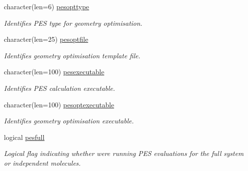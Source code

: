 \begin{DoxyCompactItemize}
character(len=6) \mbox{\hyperlink{namespaceglobaldata_a4c196084db36cecdbc9b6a6508a34aeb}{pesopttype}}
\begin{DoxyCompactList}\small\item\em Identifies P\+ES type for geometry optimisation. \end{DoxyCompactList}\item 
\mbox{\label{namespaceglobaldata_a0f59e857d2686ff93733a9a7240c88fa}} 
character(len=25) \mbox{\hyperlink{namespaceglobaldata_a0f59e857d2686ff93733a9a7240c88fa}{pesoptfile}}
\begin{DoxyCompactList}\small\item\em Identifies geometry optimisation template file. \end{DoxyCompactList}\item 
\mbox{\label{namespaceglobaldata_ab85519f27f07052f751947691618be2c}} 
character(len=100) \mbox{\hyperlink{namespaceglobaldata_ab85519f27f07052f751947691618be2c}{pesexecutable}}
\begin{DoxyCompactList}\small\item\em Identifies P\+ES calculation executable. \end{DoxyCompactList}\item 
\mbox{\label{namespaceglobaldata_a795b05df745173ba8a36092a91c6dc03}} 
character(len=100) \mbox{\hyperlink{namespaceglobaldata_a795b05df745173ba8a36092a91c6dc03}{pesoptexecutable}}
\begin{DoxyCompactList}\small\item\em Identifies geometry optimisation executable. \end{DoxyCompactList}\item 
\mbox{\label{namespaceglobaldata_a9314aeadb612bd13d7d10651767fd095}} 
logical \mbox{\hyperlink{namespaceglobaldata_a9314aeadb612bd13d7d10651767fd095}{pesfull}}
\begin{DoxyCompactList}\small\item\em Logical flag indicating whether we\textquotesingle{}re running P\+ES evaluations for the full system or independent molecules. \end{DoxyCompactList}\item 
\mbox{\label{namespaceglobaldata_aea9bf3d8b819c9b424af3847409d1e54}} 

\end{DoxyCompactItemize}
